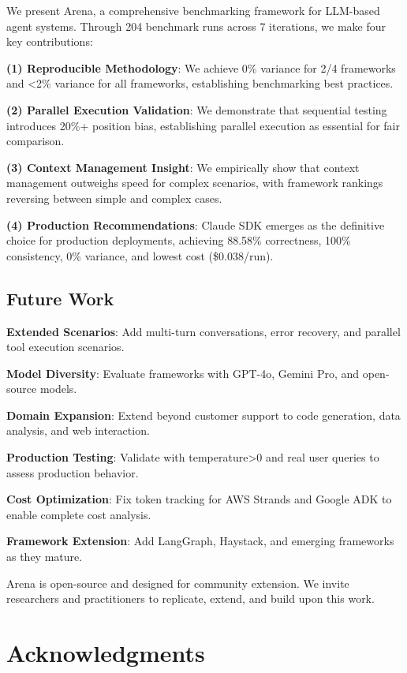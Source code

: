 \documentclass[sigconf,nonacm]{acmart}
\begin{document}
We present Arena, a comprehensive benchmarking framework for LLM-based agent systems. Through 204 benchmark runs across 7 iterations, we make four key contributions:

\textbf{(1) Reproducible Methodology}: We achieve 0\% variance for 2/4 frameworks and <2\% variance for all frameworks, establishing benchmarking best practices.

\textbf{(2) Parallel Execution Validation}: We demonstrate that sequential testing introduces 20\%+ position bias, establishing parallel execution as essential for fair comparison.

\textbf{(3) Context Management Insight}: We empirically show that context management outweighs speed for complex scenarios, with framework rankings reversing between simple and complex cases.

\textbf{(4) Production Recommendations}: Claude SDK emerges as the definitive choice for production deployments, achieving 88.58\% correctness, 100\% consistency, 0\% variance, and lowest cost (\$0.038/run).

\subsection{Future Work}

\textbf{Extended Scenarios}: Add multi-turn conversations, error recovery, and parallel tool execution scenarios.

\textbf{Model Diversity}: Evaluate frameworks with GPT-4o, Gemini Pro, and open-source models.

\textbf{Domain Expansion}: Extend beyond customer support to code generation, data analysis, and web interaction.

\textbf{Production Testing}: Validate with temperature>0 and real user queries to assess production behavior.

\textbf{Cost Optimization}: Fix token tracking for AWS Strands and Google ADK to enable complete cost analysis.

\textbf{Framework Extension}: Add LangGraph, Haystack, and emerging frameworks as they mature.

Arena is open-source and designed for community extension. We invite researchers and practitioners to replicate, extend, and build upon this work.

\section{Acknowledgments}
\end{document}
